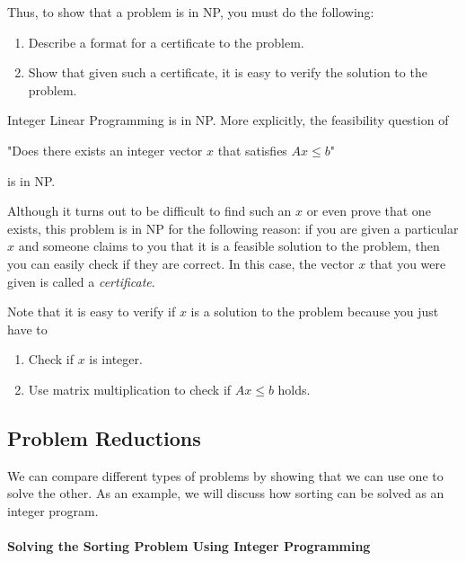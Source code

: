 Thus, to show that a problem is in NP, you must do the following:
\begin{enumerate}
\item Describe a format for a certificate to the problem.
\item Show that given such a certificate, it is easy to verify the solution to the problem.
\end{enumerate}
\begin{example}{}{}
Integer Linear Programming is in NP.  More explicitly, the feasibility question of
\begin{center}
"Does there exists an integer vector $x$ that satisfies $Ax\leq b$"
\end{center}
is in NP.  

Although it turns out to be difficult to find such an $x$ or even prove that one exists, this problem is in NP for the following reason:  if you are given a particular $x$ and someone claims to you that it is a feasible solution to the problem, then you can easily check if they are correct.  
In this case, the vector $x$ that you were given is called a \emph{certificate}.

Note that it is easy to verify if $x$ is a solution to the problem because you just have to 
\begin{enumerate}
\item Check if $x$ is integer.
\item Use matrix multiplication to check if $Ax \leq b$ holds.
\end{enumerate}
\end{example}
\subsection{Problem Reductions}

We can compare different types of problems by showing that we can use one to solve the other.  As an example, we will discuss how sorting can be solved as an integer program.

%
%

\paragraph{Solving the Sorting Problem Using Integer Programming}

